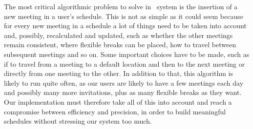 The most critical algorithmic problem to solve in \projectname~system is the insertion of a new meeting in a user's schedule. This is not as simple as it could seem because for every new meeting in a schedule a lot of things need to be taken into account and, possibly, recalculated and updated, such as whether the other meetings remain consistent, where flexible breaks can be placed, how to travel between subsequent meetings and so on. Some important choices have to be made, such as if to travel from a meeting to a default location and then to the next meeting or directly from one meeting to the other. In addition to that, this algorithm is likely to run quite often, as our users are likely to have a few meetings each day and possibly many more invitations, plus as many flexible breaks as they want. Our implementation must therefore take all of this into account and reach a compromise between efficiency and precision, in order to build meaningful schedules without stressing our system too much.